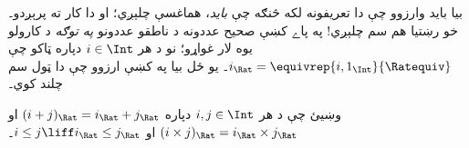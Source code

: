 \documentclass[../../../include/open-logic-section]{subfiles}
\begin{document}
بيا بايد وارزوو چې دا تعريفونه لکه څنګه چې \emph{بايد}، هماغسې
چلېږي؛ او دا کار  ته پرېږدو۔ خو رښتيا هم سم
چلېږي!{} په پاے کښې صحيح عددونه د ناطقو عددونو \emph{په توګه}
د کارولو يوه لار غواړو؛ نو د هر $i \in \Int$ دپاره ټاکو چې
$i_\Rat = \equivrep{i, 1_\Int}{\Ratequiv}$۔ يو ځل بيا په
 کښې ارزوو چې دا ټول سم چلند کوي۔

\begin{prob}
وښيئ چې د هر $i, j \in \Int$ دپاره $(i + j)_\Rat = i_\Rat+ j_\Rat$
او $(i \times j)_\Rat = i_\Rat \times j_\Rat$ او
$i \leq j \liff i_\Rat \leq j_\Rat$۔
\end{prob}
\end{document}
